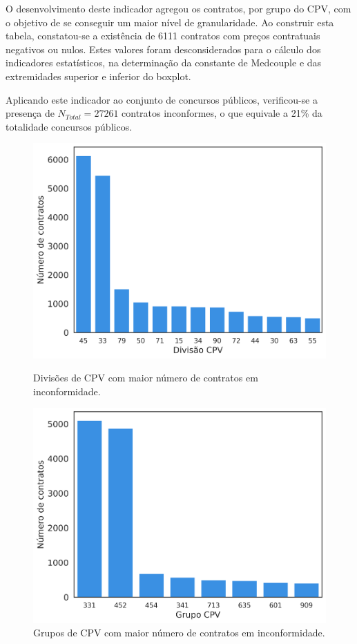 O desenvolvimento deste indicador agregou os contratos, por grupo do CPV, com o objetivo de se conseguir um maior nível de granularidade. Ao construir esta tabela, constatou-se a existência de 6111 contratos com preços contratuais negativos ou nulos. Estes valores foram desconsiderados para o cálculo dos indicadores estatísticos, na determinação da constante de Medcouple e das extremidades superior e inferior do boxplot. 

Aplicando este indicador ao conjunto de concursos públicos, verificou-se a presença de $N_{Total} = 27261$ contratos inconformes, o que equivale a 21\% da totalidade concursos públicos.  

\begin{figure}[H]
	\centering
	\begin{minipage}{.48\linewidth}
		\includegraphics[width=\linewidth]{imagens/r017/cpvdiv.png}
		\caption{Divisões de CPV com maior número de contratos em inconformidade.}
	\end{minipage}
	\hfill
	\begin{minipage}{.49\linewidth}
		\includegraphics[width=\linewidth]{imagens/r017/cpvgroup.png}
		\caption{Grupos de CPV com maior número de contratos em inconformidade.}
	\end{minipage}
\end{figure}



